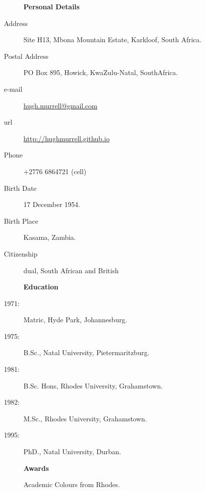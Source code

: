 \documentclass[12pt]{article}
\begin{document}
\begin{multicols}{2}
\begin{description}\item[] \begin{description}\item[] {\large \bf   Personal Details  }
\item[Address]  Site H13, Mbona Mountain Estate, Karkloof, South Africa.
\item[Postal Address] PO Box 895, Howick, KwaZulu-Natal, SouthAfrica.
\item[e-mail]  \url{hugh.murrell@gmail.com}
\item[url]  \url{http://hughmurrell.github.io}
\item[Phone]  +2776 6864721 (cell) 
\item[Birth Date]  17 December 1954.
\item[Birth Place]  Kasama, Zambia.
\item[Citizenship]  dual, South African and British
\end{description}
\end{description}

\begin{description}\item[] \begin{description}\item[] {\large \bf   Education  }    
\item[1971:] Matric, Hyde Park, Johannesburg.
  \item[1975:]  B.Sc., Natal University, Pietermaritzburg. 
  \item[1981:]  B.Sc. Hons, Rhodes University, Grahamstown. 
  \item[1982: ] M.Sc., Rhodes University, Grahamstown. 
  \item[1995: ] PhD., Natal University, Durban. 
 \end{description}
 \end{description}
 
 \begin{description}\item[] \begin{description}\item[] {\large \bf   Awards  } 
  \item[ ]Academic Colours from Rhodes.  
\end{description}
\end{description}



\end{multicols}
\end{document}
